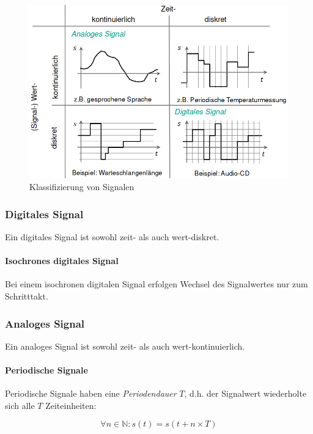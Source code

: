 \documentclass[a4paper, 14pt]{article}
\begin{document}
	\begin{figure}
		\includegraphics[width=\textwidth]{images/03-signal-classification.png}
		\caption{Klassifizierung von Signalen}
	\end{figure}

	\subsubsection{Digitales Signal}

	Ein digitales Signal ist sowohl zeit- als auch wert-diskret.

	\paragraph{Isochrones digitales Signal}

	Bei einem isochronen digitalen Signal erfolgen Wechsel des Signalwertes nur zum Schritttakt.

	\subsubsection{Analoges Signal}

	Ein analoges Signal ist sowohl zeit- als auch wert-kontinuierlich.

	\paragraph{Periodische Signale}

	Periodische Signale haben eine \emph{Periodendauer} $T$, d.h. der Signalwert wiederholte sich alle $T$ Zeiteinheiten:

	\begin{equation*}
		\forall n \in \mathbb{N} : s(t) = s(t + n \times T)
	\end{equation*}
\end{document}
